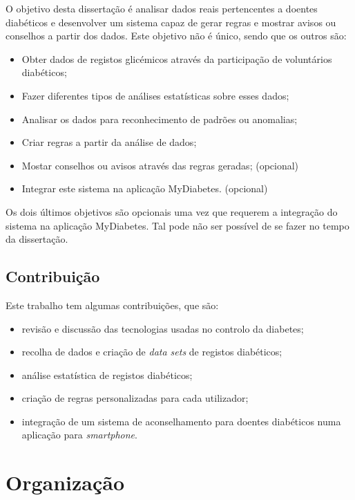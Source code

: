O objetivo desta dissertação é analisar dados reais pertencentes a doentes diabéticos e desenvolver um sistema capaz de gerar regras e mostrar avisos ou conselhos a partir dos dados. Este objetivo não é único, sendo que os outros são:

\begin{itemize}
	\item Obter dados de registos glicémicos através da participação de voluntários diabéticos;
	\item Fazer diferentes tipos de análises estatísticas sobre esses dados;
	\item Analisar os dados para reconhecimento de padrões ou anomalias;
	\item Criar regras a partir da análise de dados;
	\item Mostar conselhos ou avisos através das regras geradas; (opcional)
	\item Integrar este sistema na aplicação MyDiabetes. (opcional)
\end{itemize}

Os dois últimos objetivos são opcionais uma vez que requerem a integração do sistema na aplicação MyDiabetes. Tal pode não ser possível de se fazer no tempo da dissertação.

\subsection{Contribuição}

Este trabalho tem algumas contribuições, que são:

\begin{itemize}
	\item revisão e discussão das tecnologias usadas no controlo da diabetes;
	\item recolha de dados e criação de \textit{data sets} de registos diabéticos;
	\item análise estatística de registos diabéticos;
	\item criação de regras personalizadas para cada utilizador;
	\item integração de um sistema de aconselhamento para doentes diabéticos numa aplicação para \textit{smartphone}.
\end{itemize}


\section{Organização}

